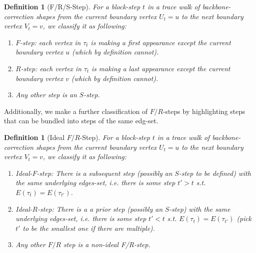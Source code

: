 \documentclass[12pt]{article}
\newtheorem{definition}[theorem]{Definition}
\begin{document}
\begin{definition}[F/R/S-Step]
 For a block-step $t$ in a trace walk of backbone-correction shapes from the current boundary vertex $U_{t}=u$ to the next boundary vertex $V_{t} =v$, we classify it as following:
\begin{enumerate}
\item $F$-step: each vertex in $\tau_t$ is making a first appearance except the current boundary vertex $u$ (which by definition cannot).
\item   $R$-step: each vertex in $\tau_t$ is making a last appearance except the current boundary vertex $v$ (which by definition cannot). 
 \item Any other step is an $S$-step.
\end{enumerate}

\end{definition}
Additionally, we make a further classification of $F/R$-steps by highlighting steps that can be bundled into steps of the same edg-set.
\begin{definition}[Ideal $F/R$-Step]
For a block-step $t$ in a trace walk of backbone-correction shapes from the current boundary vertex $U_{t}=u$ to the next boundary vertex $V_{t} =v$, we classify it as following:
\begin{enumerate}
\item Ideal-$F$-step:  There is a subsequent step (possibly an $S$-step to be defined) with the same underlying edges-set, i.e. there is some step $t'>t$ s.t. $E(\tau_t) = E(\tau_{t'})$. 
\item   Ideal-$R$-step: There is a a prior step (possibly an $S$-step) with the same underlying edges-set, i.e. there is some step $t'<t$ s.t. $E(\tau_t) = E(\tau_{t'})$ (pick $t'$ to be the smallest one if there are multiple).
 \item Any other $F/R$ step is a \emph{non-ideal} F/R-step.
\end{enumerate}
 \end{definition}
\end{document}
